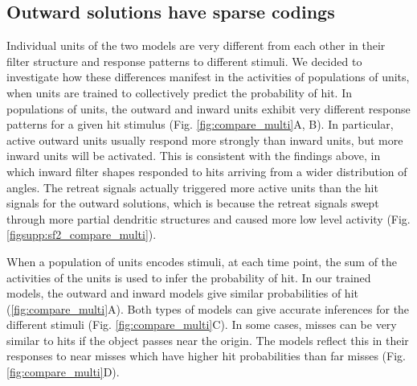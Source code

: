 \documentclass[pdftex,9pt,lineno]{elife}
\begin{document}
\begin{figure}
\label{fig:compare_single}
\end{figure}

\subsection{Outward solutions have sparse codings}

Individual units of the two models are very different from each other in their filter structure and response patterns to different stimuli. We decided to investigate how these differences manifest in the activities of populations of units, when units are trained to collectively predict the probability of hit. In populations of units, the outward and inward units exhibit very different response patterns for a given hit stimulus (Fig. \ref{fig:compare_multi}A, B). In particular, active outward units usually respond more strongly than inward units, but more inward units will be activated. This is consistent with the findings above, in which inward filter shapes responded to hits arriving from a wider distribution of angles. The retreat signals actually triggered more active units than the hit signals for the outward solutions, which is because the retreat signals swept through more partial dendritic structures and caused more low level activity (Fig. \ref{figsupp:sf2_compare_multi}).

When a population of units encodes stimuli, at each time point, the sum of the activities of the units is used to infer the probability of hit. In our trained models, the outward and inward models give similar probabilities of hit (\ref{fig:compare_multi}A). Both types of models can give accurate inferences for the different stimuli (Fig. \ref{fig:compare_multi}C). In some cases, misses can be very similar to hits if the object passes near the origin. The models reflect this in their responses to near misses which have higher hit probabilities than far misses (Fig. \ref{fig:compare_multi}D).
\end{document}
